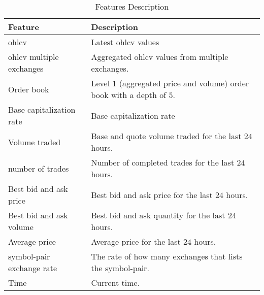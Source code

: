 \begin{table}[ht]
    \centering
    \begin{tabular}{p{} p{}}
        \hline
        \textbf{Feature} & \textbf{Description}\\
        \hline
        \ac{ohlcv}                      & Latest \ac{ohlcv} values \\
        \hline
        \ac{ohlcv} multiple exchanges   & Aggregated \ac{ohlcv} values from multiple exchanges.\\
        \hline
        Order book                      & Level $1$ (aggregated price and volume) order book with a depth of $5$.\\
        \hline
        Base capitalization rate        & Base capitalization rate \\
        \hline
        Volume traded                   & Base and quote volume traded for the last $24$ hours. \\
        \hline
        number of trades                & Number of completed trades for the last $24$ hours.\\      
        \hline
        Best bid and ask price          & Best bid and ask price for the last $24$ hours.\\
        \hline
        Best bid and ask volume         & Best bid and ask quantity for the last $24$ hours. \\
        \hline
        Average price                   & Average price for the last $24$ hours.\\
        \hline
        symbol-pair exchange rate       & The rate of how many exchanges that lists the symbol-pair.\\ 
        \hline
        Time                            & Current time.\\
        \hline
    \end{tabular}
    \caption{Features Description}
    \label{tab:features}
\end{table}
